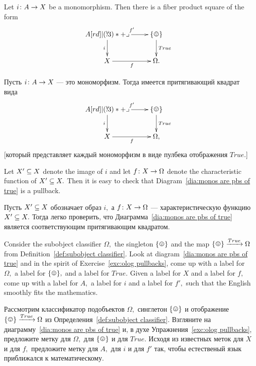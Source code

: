 \documentclass[CT4S-EN-RU]{subfiles}
\begin{document}
\begin{corollaryENG}\label{cor:monos are pullbacks of true}
Let $i\taking A\to X$ be a monomorphism. Then there is a fiber product square of the form 
\begin{align}\label{dia:monos are pbs of true}
\xymatrix{A\ar[r]^{f'}\ar[d]_i\ullimit&\singleton\ar[d]^{True}\\X\ar[r]_f&\Omega.}
\end{align}
\end{corollaryENG}

\begin{corollaryRUS}\label{cor:monos are pullbacks of true}
Пусть $i\taking A\to X$ — это мономорфизм. Тогда имеется притягивающий квадрат вида 
\begin{align}\label{dia:monos are pbs of true}
\xymatrix{A\ar[r]^{f'}\ar[d]_i\ullimit&\singleton\ar[d]^{True}\\X\ar[r]_f&\Omega,}
\end{align}
[который представляет каждый мономорфизм в виде пулбека отображения $True.$]
\end{corollaryRUS}

\begin{proofENG}
Let $X'\ss X$ denote the image of $i$ and let $f\taking X\to\Omega$ denote the characteristic function of $X'\ss X.$ Then it is easy to check that Diagram~\ref{dia:monos are pbs of true} is a pullback.
\end{proofENG}

\begin{proofRUS}
Пусть $X'\ss X$ обозначает образ $i,$ а $f\taking X\to\Omega$ — характеристическую функцию $X'\ss X.$ Тогда легко проверить, что Диаграмма~\ref{dia:monos are pbs of true} является соответствующим притягивающим квадратом.
\end{proofRUS}

\begin{exerciseENG}
Consider the subobject classifier $\Omega,$ the singleton $\singleton$ and the map $\singleton\To{True}\Omega$ from Definition~\ref{def:subobject classifier}. Look at diagram~\ref{dia:monos are pbs of true} and in the spirit of Exercise~\ref{exc:olog pullbacks}, come up with a label for $\Omega,$ a label for $\singleton,$ and a label for $True.$ Given a label for $X$ and a label for $f,$ come up with a label for $A,$ a label for $i$ and a label for $f',$ such that the English smoothly fits the mathematics.
\end{exerciseENG}

\begin{exerciseRUS}
Рассмотрим классификатор подобъектов $\Omega,$ синглетон $\singleton$ и отображение $\singleton\To{True}\Omega$ из Определения~\ref{def:subobject classifier}. Взгляните на диаграмму~\ref{dia:monos are pbs of true} и, в духе Упражнения~\ref{exc:olog pullbacks}, предложите метку для $\Omega,$ для $\singleton$ и для $True.$ Исходя из известных меток для $X$ и для $f,$ предложите метку для $A,$ для $i$ и для $f'$ так, чтобы естественый язык приближался к математическому.%
\end{exerciseRUS}
\end{document}

